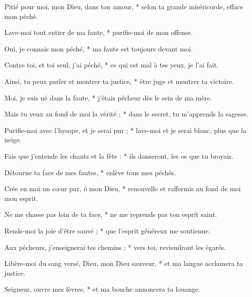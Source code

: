 \item Pitié pour moi, mon Dieu, dans ton amour, * selon ta grande miséricorde, efface mon péché.

\item Lave-moi tout entier de ma faute, * purifie-moi de mon offense.

\item Oui, je connais mon péché, * ma faute est toujours devant moi.

\item Contre toi, et toi seul, j'ai péché, * ce qui est mal à tes yeux, je l'ai fait.

\item Ainsi, tu peux parler et montrer ta justice, * être juge et montrer ta victoire.

\item Moi, je suis né dans la faute, * j'étais pécheur dès le sein de ma mère.

\item Mais tu veux au fond de moi la vérité ; * dans le secret, tu m'apprends la sagesse.

\item Purifie-moi avec l'hysope, et je serai pur ; * lave-moi et je serai blanc, plus que la neige.

\item Fais que j'entende les chants et la fête : * ils danseront, les os que tu broyais.

\item Détourne ta face de mes fautes, * enlève tous mes péchés.

\item Crée en moi un cœur pur, ô mon Dieu, * renouvelle et raffermis au fond de moi mon esprit.

\item Ne me chasse pas loin de ta face, * ne me reprends pas ton esprit saint.

\item Rends-moi la joie d'être sauvé ; * que l'esprit généreux me soutienne.

\item Aux pécheurs, j'enseignerai tes chemins ; * vers toi, reviendront les égarés.

\item Libère-moi du sang versé, Dieu, mon Dieu sauveur, * et ma langue acclamera ta justice.

\item Seigneur, ouvre mes lèvres, * et ma bouche annoncera ta louange.


